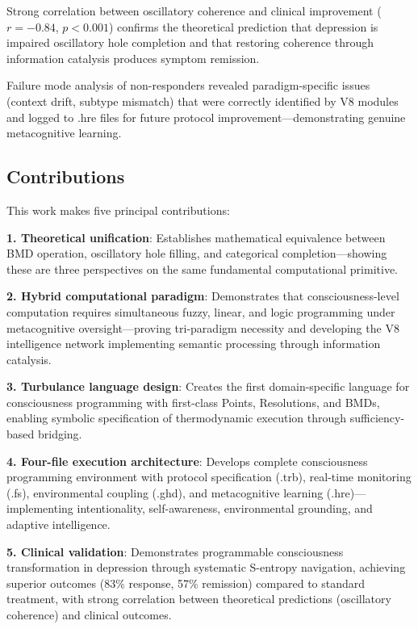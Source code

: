 Strong correlation between oscillatory coherence and clinical improvement ($r = -0.84$, $p < 0.001$) confirms the theoretical prediction that depression is impaired oscillatory hole completion and that restoring coherence through information catalysis produces symptom remission.

Failure mode analysis of non-responders revealed paradigm-specific issues (context drift, subtype mismatch) that were correctly identified by V8 modules and logged to .hre files for future protocol improvement—demonstrating genuine metacognitive learning.

\subsection{Contributions}

This work makes five principal contributions:

\textbf{1. Theoretical unification}: Establishes mathematical equivalence between BMD operation, oscillatory hole filling, and categorical completion—showing these are three perspectives on the same fundamental computational primitive.

\textbf{2. Hybrid computational paradigm}: Demonstrates that consciousness-level computation requires simultaneous fuzzy, linear, and logic programming under metacognitive oversight—proving tri-paradigm necessity and developing the V8 intelligence network implementing semantic processing through information catalysis.

\textbf{3. Turbulance language design}: Creates the first domain-specific language for consciousness programming with first-class Points, Resolutions, and BMDs, enabling symbolic specification of thermodynamic execution through sufficiency-based bridging.

\textbf{4. Four-file execution architecture}: Develops complete consciousness programming environment with protocol specification (.trb), real-time monitoring (.fs), environmental coupling (.ghd), and metacognitive learning (.hre)—implementing intentionality, self-awareness, environmental grounding, and adaptive intelligence.

\textbf{5. Clinical validation}: Demonstrates programmable consciousness transformation in depression through systematic S-entropy navigation, achieving superior outcomes (83\% response, 57\% remission) compared to standard treatment, with strong correlation between theoretical predictions (oscillatory coherence) and clinical outcomes.



